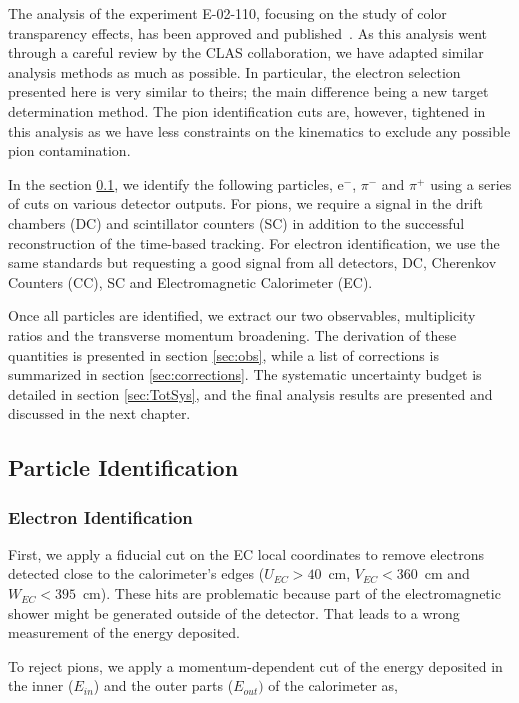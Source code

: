 The analysis of the experiment E-02-110, focusing on the study of color 
transparency effects, has been approved and published~\cite{ElFassi:2008}. As this 
analysis went through a careful review by the CLAS collaboration, we have 
adapted similar analysis methods as much as possible. In particular, the electron selection 
presented here is very similar to theirs; the main difference being a new 
target determination method. The pion identification cuts are, however, tightened
in this analysis as we have less constraints on the kinematics to exclude any possible pion contamination.

In the section \ref{sec:pid}, we identify the following particles, e$^-$, 
$\pi^-$ and $\pi^+$ using a series of cuts on various detector outputs. For 
pions, we require a signal in the drift chambers (DC) and scintillator counters (SC) in 
addition to the successful reconstruction of the time-based tracking. For electron 
identification, we use the same standards but requesting a good signal from 
all detectors, DC, Cherenkov Counters (CC), SC and Electromagnetic 
Calorimeter (EC).

Once all particles are identified, we extract our two observables, 
multiplicity ratios and the transverse momentum broadening. The derivation 
of these quantities is presented in section \ref{sec:obs}, while a list of 
corrections  is summarized in section \ref{sec:corrections}. The systematic 
uncertainty budget is detailed in section \ref{sec:TotSys}, and the final 
analysis results are presented and discussed in the next chapter.

\subsection{Particle Identification}
\label{sec:pid}

\subsubsection{Electron Identification}

First, we apply a fiducial cut on the EC local coordinates to remove electrons detected close to the calorimeter's edges ($U_{EC}>40$~cm, $V_{EC}<360$~cm and 
$W_{EC}<395$~cm). These hits are problematic because part of the electromagnetic shower might be generated outside of the detector. That leads to a wrong measurement of the energy deposited.

To reject pions, we apply a momentum-dependent cut of the energy deposited in the inner ($E_{in}$) and the outer parts ($E_{out})$ of the calorimeter as,

